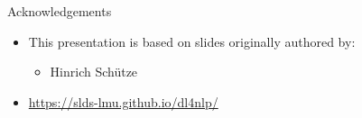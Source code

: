 \begin{vbframe}{Acknowledgements}

\vfill

\begin{itemize}
\item This presentation is based on slides originally authored by:
  \begin{itemize}
\item Hinrich Sch\"{u}tze
\end{itemize}

\item \url{https://slds-lmu.github.io/dl4nlp/}
\end{itemize}

\vfill

\end{vbframe}


